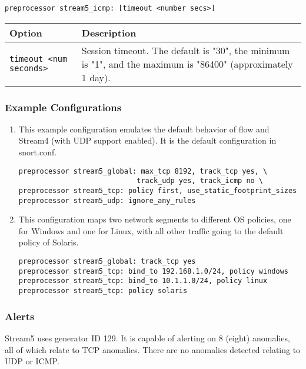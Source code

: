 \documentclass[english]{report}
\begin{document}
\begin{verbatim}
preprocessor stream5_icmp: [timeout <number secs>]
\end{verbatim}

\begin{tabular}{| l | p{3.5in} |}
\hline
\textbf{Option} & \textbf{Description}\\
\hline 
\hline 
\texttt{timeout <num seconds>} & Session timeout.  The default is "30", the minimum is "1", and the maximum is "86400" (approximately 1 day).\\
\hline
\end{tabular}

\subsubsection{Example Configurations}

\begin{enumerate}
\item{}
This example configuration emulates the default behavior of flow and
Stream4 (with UDP support enabled).  It is the default configuration in
snort.conf.

\begin{verbatim}
preprocessor stream5_global: max_tcp 8192, track_tcp yes, \
                            track_udp yes, track_icmp no \
preprocessor stream5_tcp: policy first, use_static_footprint_sizes
preprocessor stream5_udp: ignore_any_rules
\end{verbatim}

\item{}
This configuration maps two network segments to different OS policies, one
for Windows and one for Linux, with all other traffic going to the default
policy of Solaris.

\begin{verbatim}
preprocessor stream5_global: track_tcp yes
preprocessor stream5_tcp: bind_to 192.168.1.0/24, policy windows
preprocessor stream5_tcp: bind_to 10.1.1.0/24, policy linux
preprocessor stream5_tcp: policy solaris
\end{verbatim}

\end{enumerate}

\subsubsection{Alerts}
Stream5 uses generator ID 129.  It is capable of alerting on 8 (eight)
anomalies, all of which relate to TCP anomalies.  There are no
anomalies detected relating to UDP or ICMP.
\end{document}
